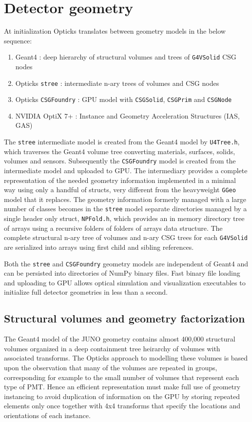 \documentclass{webofc}
\begin{document}
\section{Detector geometry} 
\label{secgeom}%
At initialization Opticks translates between geometry models in the below sequence:
%
\begin{enumerate}
\item Geant4 : deep hierarchy of structural volumes and trees of {\tt G4VSolid} CSG nodes
\item Opticks {\tt stree} : intermediate n-ary trees of volumes and CSG nodes
\item Opticks {\tt CSGFoundry} : GPU model with {\tt CSGSolid}, {\tt CSGPrim} and {\tt CSGNode} 
\item NVIDIA OptiX 7+ : Instance and Geometry Acceleration Structures (IAS, GAS)
\end{enumerate}  
%
The {\tt stree} intermediate model is created from the Geant4 model by {\tt U4Tree.h},
which traverses the Geant4 volume tree converting materials, surfaces, solids, volumes and sensors.
Subsequently the {\tt CSGFoundry} model is created from the intermediate model and uploaded to GPU.   
The intermediary provides a complete representation of the needed geometry information
implemented in a minimal way using only a handful of structs, very different from the heavyweight {\tt GGeo} 
model that it replaces. 
The geometry information formerly managed with a large number of classes becomes 
in the {\tt stree} model separate directories managed by a single header only struct, {\tt NPFold.h}, 
which provides an in memory directory tree of arrays using a recursive folders of folders of arrays data structure.
The complete structural n-ary tree of volumes and n-ary CSG trees for each {\tt G4VSolid} 
are serialized into arrays using first child and sibling references.

Both the {\tt stree} and {\tt CSGFoundry} geometry models are independent of Geant4 and can be persisted into directories of NumPy\cite{numpy} binary files. 
Fast binary file loading and uploading to GPU allows optical simulation and visualization
executables to initialize full detector geometries in less than a second.  
%
\subsection{Structural volumes and geometry factorization}%
%
The Geant4 model of the JUNO geometry contains almost 400,000 structural volumes organized in a deep containment tree
heirarchy of volumes with associated transforms.
The Opticks approach to modelling these volumes is based upon the observation that many of the
volumes are repeated in groups, corresponding for example to the small number of volumes that represent each type of PMT.
Hence an efficient representation must make full use of geometry instancing to avoid duplication of information 
on the GPU by storing repeated elements only once together with 4x4 transforms
that specify the locations and orientations of each instance.
\end{document}
